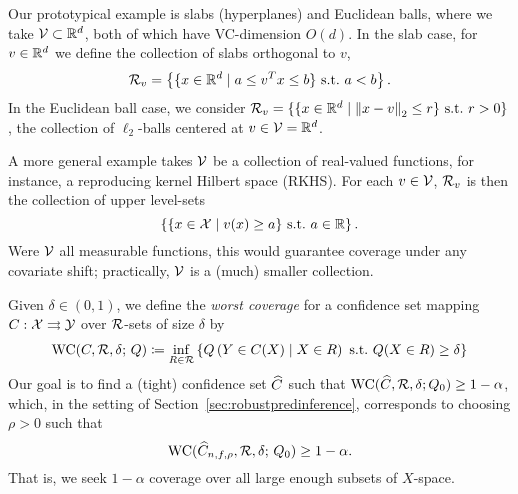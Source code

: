 \begin{example}
  \label{ex:slab-euclideanballs}
  Our prototypical example is slabs (hyperplanes) and Euclidean
  balls, where we take $\mathcal{V} \subset \mathbb{R}^d$, both of which
  have VC-dimension $O(d)$. In the slab case, for
  $v \in \mathbb{R}^d$ we define the collection
  of slabs orthogonal to $v$,
  \begin{equation*}
    \mathcal{R}_v = \left\{ \{x \in \mathbb{R}^d \mid a \le v^T x \le b \}
    ~\mbox{s.t.}~ a < b \right\}.
  \end{equation*}
  In the Euclidean ball case, we consider $\mathcal{R}_v = \{ \{x
  \in \mathbb{R}^d \mid \left\|{x-v}\right\|_2 \le r \} ~\mbox{s.t.}~ r>0 \}$, the collection of
  $\ell_2$-balls centered at $v \in \mathcal{V} = \mathbb{R}^d$.
\end{example}

\begin{example}
  \label{ex:level-sets}
  A more general example takes $\mathcal{V}$ be a collection of real-valued
  functions, for instance, a reproducing kernel Hilbert space (RKHS).  For
  each $v \in \mathcal{V}$, $ \mathcal{R}_v$ is then the collection of upper
  level-sets
  \begin{equation*}
   \left\{ \{x \in \mathcal{X} \mid v(x) \ge a \}
    ~\mbox{s.t.}~ a \in \mathbb{R} \right\}.
  \end{equation*}
  Were $\mathcal{V}$ all measurable functions, this would guarantee coverage
  under any covariate shift; practically, $\mathcal{V}$ is a (much)
  smaller collection.
\end{example}

Given $\delta \in (0, 1)$, we define the \emph{worst coverage}
for a confidence set mapping $C : \mathcal{X} \rightrightarrows \mathcal{Y}$
over $\mathcal{R}$-sets of size $\delta$ by
\begin{align}
  \label{eqn:worst-global-coverage}
  \textup{WC}(C, \mathcal{\mathcal{R}}, \delta; \, Q) \coloneqq
  \inf_{R \in \mathcal{R}}
  \left\{Q\left( Y \in C(X) \mid X \in R \right)
  ~ \mbox{s.t.}~
  Q(X \in R) \ge \delta \right\}
\end{align}
Our goal is to find a (tight) confidence set
$\widehat{C}$ such that
$\textup{WC}(\widehat{C}, \mathcal{R}, \delta; Q_0) \ge 1 - \alpha$, which,
in the setting of Section~\ref{sec:robustpredinference},
corresponds to
choosing $\rho > 0$ such that
\begin{equation*}
  \textup{WC}(\widehat{C}_{n,f,\rho},
  \mathcal{R}, \delta; \, Q_0) \ge 1-\alpha.
\end{equation*}
That is, we seek $1 - \alpha$ coverage over all large enough subsets
of $X$-space. 

